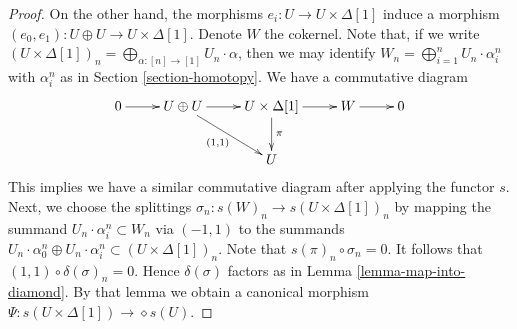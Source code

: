\begin{proof}
\medskip\noindent
On the other hand, the morphisms $e_i : U \to U \times \Delta[1]$ induce
a morphism $(e_0, e_1) : U \oplus U \to U\times \Delta[1]$.
Denote $W$ the cokernel. Note that, if we write
$(U \times \Delta[1])_n = \bigoplus_{\alpha : [n] \to [1]} U_n \cdot \alpha$,
then we may identify
$W_n = \bigoplus_{i = 1}^n U_n \cdot \alpha^n_i$ with
$\alpha^n_i$ as in Section \ref{section-homotopy}.
We have a commutative diagram
$$
\xymatrix{
0 \ar[r] &
U \oplus U \ar[rd]_{(1, 1)} \ar[r] &
U \times \Delta[1] \ar[d]^\pi \ar[r] &
W \ar[r] &
0 \\
& & U & &
}
$$
This implies we have a similar commutative diagram after
applying the functor $s$. Next, we choose the splittings
$\sigma_n : s(W)_n \to s(U\times \Delta[1])_n$ by mapping
the summand $U_n \cdot \alpha^n_i \subset W_n$ via $(-1, 1)$
to the summands $U_n \cdot \alpha^n_0 \oplus U_n \cdot \alpha^n_i
\subset (U \times \Delta[1])_n$. Note that $s(\pi)_n \circ \sigma_n = 0$.
It follows that $(1, 1) \circ \delta(\sigma)_n = 0$.
Hence $\delta(\sigma)$ factors as in
Lemma \ref{lemma-map-into-diamond}. By that lemma
we obtain a canonical morphism
$\Psi : s(U \times \Delta[1]) \to \diamond{s(U)}$.


\end{proof}

